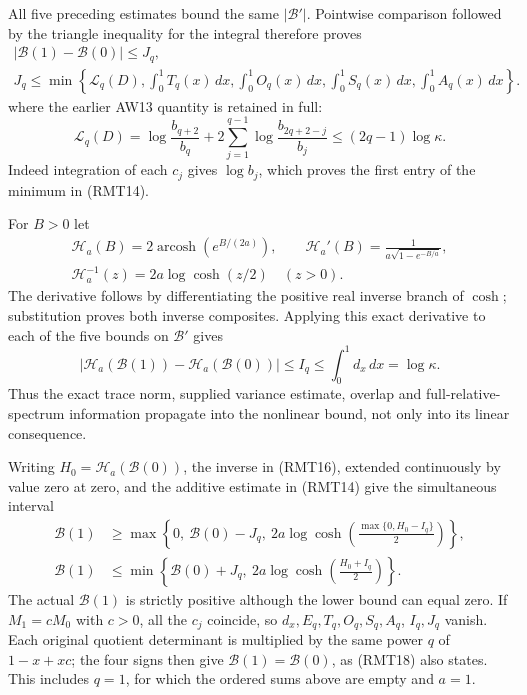 All five preceding estimates bound the same \(|\mathcal B'|\).
Pointwise comparison followed by the triangle inequality
for the integral therefore proves
\[
 \begin{gathered}
 |\mathcal B(1)-\mathcal B(0)|\leq J_q,\\
 J_q\leq
 \min\left\{\mathcal L_q(D),\int_0^1T_q(x)\,dx,
             \int_0^1O_q(x)\,dx,\int_0^1S_q(x)\,dx,
                         \int_0^1A_q(x)\,dx\right\}.
 \end{gathered}
 \tag{RMT14}
\]
where the earlier AW13 quantity is retained in full:
\[
 \mathcal L_q(D)=\log\frac{b_{q+2}}{b_q}
       +2\sum_{j=1}^{q-1}\log\frac{b_{2q+2-j}}{b_j}
       \leq(2q-1)\log\kappa.
 \tag{RMT15}
\]
Indeed integration of each \(c_j\) gives \(\log b_j\),
which proves the first entry of the minimum in (RMT14).

For \(B>0\) let
\[
 \begin{gathered}
 \mathscr H_a(B)=2\operatorname{arcosh}(e^{B/(2a)}),\qquad
 \mathscr H_a'(B)=
 \frac{1}{a\sqrt{1-e^{-B/a}}},\\
 \mathscr H_a^{-1}(z)=2a\log\cosh(z/2)\quad(z>0).
 \end{gathered}
 \tag{RMT16}
\]
The derivative follows by differentiating the positive real
inverse branch of \(\cosh\); substitution proves both inverse
composites.  Applying this exact derivative to each of the
five bounds on \(\mathcal B'\) gives
\[
 |\mathscr H_a(\mathcal B(1))-\mathscr H_a(\mathcal B(0))|
 \leq I_q\leq\int_0^1d_x\,dx=\log\kappa.
 \tag{RMT17}
\]
Thus the exact trace norm, supplied variance estimate, overlap
and full-relative-spectrum information propagate into the nonlinear bound,
not only into its linear consequence.

Writing \(H_0=\mathscr H_a(\mathcal B(0))\), the inverse
in (RMT16), extended continuously by value zero at zero,
and the additive estimate in (RMT14) give the simultaneous
interval
\[
 \begin{split}
 \mathcal B(1)&\geq
 \max\left\{0,\ \mathcal B(0)-J_q,\
   2a\log\cosh\left(\frac{\max\{0,H_0-I_q\}}2\right)\right\},\\
 \mathcal B(1)&\leq
 \min\left\{\mathcal B(0)+J_q,\
   2a\log\cosh\left(\frac{H_0+I_q}2\right)\right\}.
 \end{split}
 \tag{RMT18}
\]
The actual \(\mathcal B(1)\) is strictly positive although
the lower bound can equal zero.  If \(M_1=cM_0\) with
\(c>0\), all the \(c_j\) coincide, so \(d_x,E_q,T_q,O_q,S_q,A_q\),
\(I_q,J_q\) vanish.  Each original quotient determinant is
multiplied by the same power \(q\) of \(1-x+xc\);
the four signs then give \(\mathcal B(1)=\mathcal B(0)\),
as (RMT18) also states.  This includes \(q=1\), for which
the ordered sums above are empty and \(a=1\).

